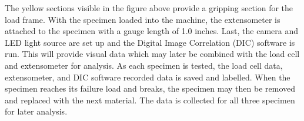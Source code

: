 The yellow sections visible in the figure above provide a gripping section for the load frame.  With the specimen loaded into the machine, the extensometer is attached to the specimen with a gauge length of 1.0 inches.  Last, the camera and LED light source are set up and the Digital Image Correlation (DIC) software is run.  This will provide visual data which may later be combined with the load cell and extensometer for analysis.  As each specimen is tested, the load cell data, extensometer, and DIC software recorded data is saved and labelled.  When the specimen reaches its failure load and breaks, the specimen may then be removed and replaced with the next material.  The data is collected for all three specimen for later analysis.